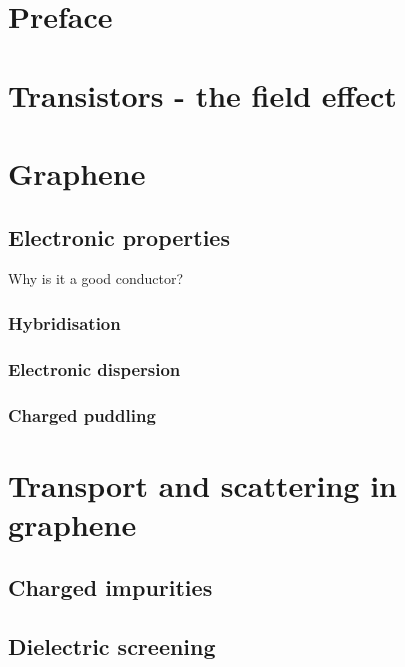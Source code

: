 \documentclass[../Matt_Gebert_Honours_Thesis.tex]{subfiles}
\begin{document}
	

	\section{Preface}
	
	\section{Transistors - the field effect}
	
	\section{Graphene}
	\subsection{Electronic properties}
	Why is it a good conductor?
	\subsubsection{Hybridisation}
	\subsubsection{Electronic dispersion}
	\subsubsection{Charged puddling}
	
	\section{Transport and scattering in graphene}
	\subsection{Charged impurities}
	\subsection{Dielectric screening}
\end{document}
